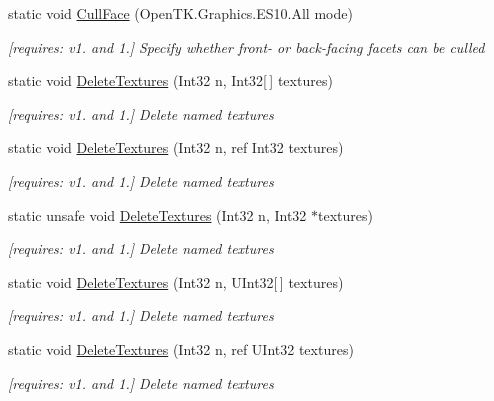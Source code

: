 \begin{DoxyCompactItemize}
static void \hyperlink{class_open_t_k_1_1_graphics_1_1_e_s10_1_1_g_l_a187d3e102d7150178cd201eb149de84e}{Cull\-Face} (Open\-T\-K.\-Graphics.\-E\-S10.\-All mode)
\begin{DoxyCompactList}\small\item\em \mbox{[}requires\-: v1. and 1.\mbox{]} Specify whether front-\/ or back-\/facing facets can be culled \end{DoxyCompactList}\item 
static void \hyperlink{class_open_t_k_1_1_graphics_1_1_e_s10_1_1_g_l_afca0c3be15ff6fddd3f25d54469818d6}{Delete\-Textures} (Int32 n, Int32\mbox{[}$\,$\mbox{]} textures)
\begin{DoxyCompactList}\small\item\em \mbox{[}requires\-: v1. and 1.\mbox{]} Delete named textures \end{DoxyCompactList}\item 
static void \hyperlink{class_open_t_k_1_1_graphics_1_1_e_s10_1_1_g_l_a459ccd31a866586932a392450c4c112b}{Delete\-Textures} (Int32 n, ref Int32 textures)
\begin{DoxyCompactList}\small\item\em \mbox{[}requires\-: v1. and 1.\mbox{]} Delete named textures \end{DoxyCompactList}\item 
static unsafe void \hyperlink{class_open_t_k_1_1_graphics_1_1_e_s10_1_1_g_l_a854387c0860c6e72e5be7e354c33910e}{Delete\-Textures} (Int32 n, Int32 $\ast$textures)
\begin{DoxyCompactList}\small\item\em \mbox{[}requires\-: v1. and 1.\mbox{]} Delete named textures \end{DoxyCompactList}\item 
static void \hyperlink{class_open_t_k_1_1_graphics_1_1_e_s10_1_1_g_l_a048cd4cadcbc47a1fa1718f9f116f4f3}{Delete\-Textures} (Int32 n, U\-Int32\mbox{[}$\,$\mbox{]} textures)
\begin{DoxyCompactList}\small\item\em \mbox{[}requires\-: v1. and 1.\mbox{]} Delete named textures \end{DoxyCompactList}\item 
static void \hyperlink{class_open_t_k_1_1_graphics_1_1_e_s10_1_1_g_l_adde3725234e3a69533bde6bb5dbee384}{Delete\-Textures} (Int32 n, ref U\-Int32 textures)
\begin{DoxyCompactList}\small\item\em \mbox{[}requires\-: v1. and 1.\mbox{]} Delete named textures \end{DoxyCompactList}\item 

\end{DoxyCompactItemize}
